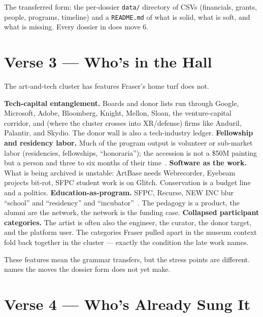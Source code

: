 \documentclass[10pt,letterpaper,twocolumn]{article}
\begin{document}
The transferred form: the per-dossier \texttt{data/} directory of CSVs (financials, grants, people, programs, timeline) and a \texttt{README.md} of what is solid, what is soft, and what is missing. Every dossier in  does move 6.

\section{Verse 3 --- Who's in the Hall}

The art-and-tech cluster has features Fraser's home turf does not.

\textbf{Tech-capital entanglement.} Boards and donor lists run through Google, Microsoft, Adobe, Bloomberg, Knight, Mellon, Sloan, the venture-capital corridor, and (where the cluster crosses into XR/defense) firms like Anduril, Palantir, and Skydio. The donor wall is also a tech-industry ledger. \textbf{Fellowship and residency labor.} Much of the program output is volunteer or sub-market labor (residencies, fellowships, ``honoraria''); the accession is not a \$50M painting but a person and three to six months of their time~\citep{ross2009nice,lorusso2019entreprecariat}. \textbf{Software as the work.} What is being archived is unstable: ArtBase needs Webrecorder, Eyebeam projects bit-rot, SFPC student work is on Glitch. Conservation is a budget line and a politics. \textbf{Education-as-program.} SFPC, Recurse, NEW INC blur ``school'' and ``residency'' and ``incubator''~\citep{ac2026sfpc,ac2026recurse,ac2026newinc}. The pedagogy is a product, the alumni are the network, the network is the funding case. \textbf{Collapsed participant categories.} The artist is often also the engineer, the curator, the donor target, and the platform user. The categories Fraser pulled apart in the museum context fold back together in the cluster --- exactly the condition the late work names.

These features mean the grammar transfers, but the stress points are different.  names the moves the dossier form does not yet make.

\section{Verse 4 --- Who's Already Sung It}
\end{document}
